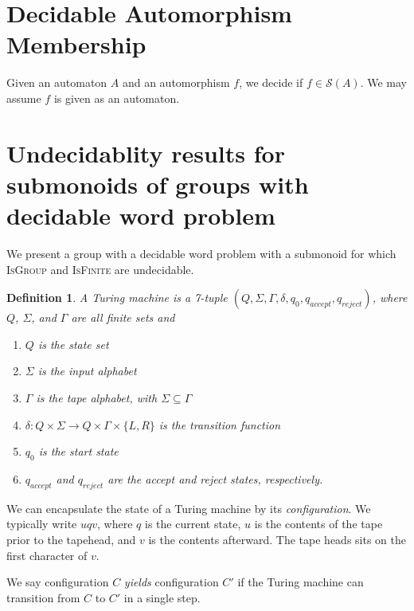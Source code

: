 \documentclass[10pt]{article} %
\newtheorem{definition}{Definition}
\newcommand{\defn}[1]{\textit{#1}}
\newcommand{\decprob}[1]{\textsc{#1}}
\begin{document}
    \section{Decidable Automorphism Membership}


    Given an automaton $A$ and an automorphism $f$, we decide if
    $f \in \mathcal{S}(A)$. We may assume $f$ is given as an
    automaton.

    \section{Undecidablity results for submonoids
      of groups with decidable word problem}

    We present a group with a decidable word problem with a submonoid
    for which \textsc{IsGroup} and \textsc{IsFinite} are undecidable.

    \begin{definition}
      A \defn{Turing machine} is a 7-tuple
      $(Q, \Sigma, \Gamma, \delta, q_0, q_{accept}, q_{reject})$,
      where $Q$, $\Sigma$, and $\Gamma$ are all finite sets and
    \begin{enumerate}
    \item $Q$ is the state set
    \item $\Sigma$ is the input alphabet
    \item $\Gamma$ is the tape alphabet, with $\Sigma \subseteq \Gamma$
    \item
      $\delta : Q \times \Sigma \rightarrow Q \times \Gamma \times
      \{L, R \}$ is the transition function
    \item $q_0$ is the start state
    \item $q_{accept}$ and $q_{reject}$ are the accept and reject
      states, respectively.
    \end{enumerate}
    \end{definition}

    We can encapsulate the state of a Turing machine by its
    \defn{configuration}. We typically write $u q v$, where $q$ is the
    current state, $u$ is the contents of the tape prior to the
    tapehead, and $v$ is the contents afterward. The tape heads sits
    on the first character of $v$.

    We say configuration $C$ \defn{yields} configuration $C'$ if the
    Turing machine can transition from $C$ to $C'$ in a single step.
\end{document}
